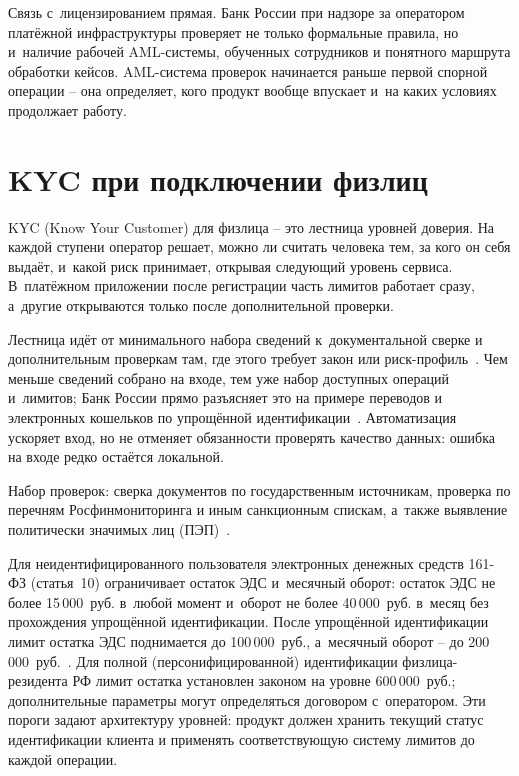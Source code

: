 Связь с~лицензированием прямая. Банк России при надзоре за
оператором платёжной инфраструктуры проверяет не только формальные
правила, но и~наличие рабочей AML-системы, обученных сотрудников
и понятного маршрута обработки кейсов. AML-система проверок начинается раньше
первой спорной операции -- она определяет, кого продукт вообще
впускает и~на каких условиях продолжает работу.

\section{KYC при подключении физлиц}\label{sec:compliance-kyc}

KYC (Know Your Customer) для физлица -- это лестница уровней
доверия. На каждой ступени оператор решает, можно ли считать
человека тем, за кого он себя выдаёт, и~какой риск принимает,
открывая следующий уровень сервиса. В~платёжном приложении после
регистрации часть лимитов работает сразу, а~другие открываются
только после дополнительной проверки.

Лестница идёт от минимального набора сведений к~документальной
сверке и дополнительным проверкам там, где этого требует закон или
риск-профиль~\cite{cbr-499p}. Чем меньше сведений собрано на входе,
тем уже набор доступных операций и~лимитов; Банк России прямо
разъясняет это на примере переводов и электронных кошельков по
упрощённой идентификации~\cite{cbr-banking-faq-identification}.
Автоматизация ускоряет вход, но не отменяет обязанности проверять
качество данных: ошибка на входе редко остаётся локальной.

Набор проверок: сверка документов
по государственным источникам, проверка по перечням
Росфинмониторинга и иным санкционным спискам, а~также выявление
политически значимых лиц (ПЭП)~\cite{cbr-499p,fatf-pep-guidance}.


Для неидентифицированного пользователя электронных денежных
средств 161-ФЗ (статья~10) ограничивает остаток ЭДС и~месячный
оборот: остаток ЭДС не более 15\,000~руб. в~любой момент
и~оборот не более 40\,000~руб. в~месяц без прохождения
упрощённой идентификации. После упрощённой идентификации
лимит остатка ЭДС поднимается до 100\,000~руб., а~месячный
оборот -- до 200\,000~руб.~\cite{fz-161}. Для полной
(персонифицированной) идентификации физлица-резидента РФ
лимит остатка установлен законом на уровне 600\,000~руб.;
дополнительные параметры могут определяться договором
с~оператором. Эти пороги задают архитектуру уровней: продукт
должен хранить текущий статус идентификации клиента и применять
соответствующую систему лимитов до каждой операции.

